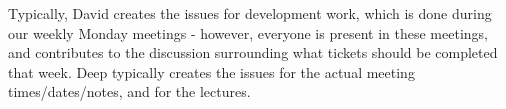 \documentclass{article}
\begin{document}
Typically, David creates the issues for development work, which is done during our weekly Monday meetings - however, everyone is present in 
these meetings, and contributes to the discussion surrounding what tickets should be completed that week. Deep typically creates the issues for 
the actual meeting times/dates/notes, and for the lectures.
\end{document}
